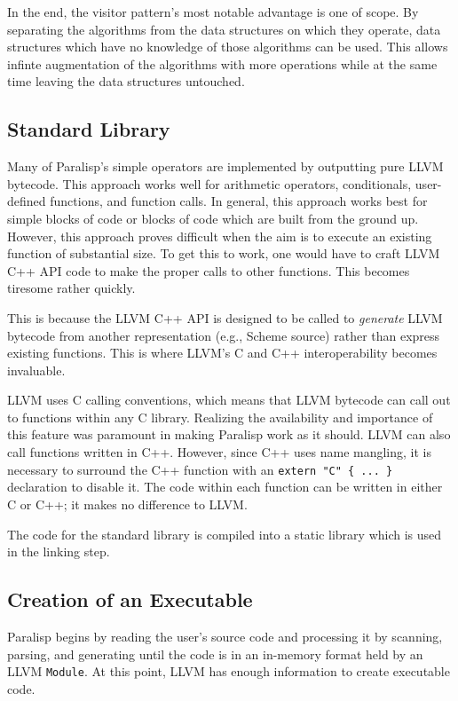 \documentclass[abstracton]{scrartcl}
\begin{document}
In the end, the visitor pattern's most notable advantage is one of scope. By separating the algorithms from the data structures on which they operate, data structures which have no knowledge of those algorithms can be used. This allows infinte augmentation of the algorithms with more operations while at the same time leaving the data structures untouched.

\subsection{Standard Library}

Many of Paralisp's simple operators are implemented by outputting pure LLVM bytecode. This approach works well for arithmetic operators, conditionals, user-defined functions, and function calls. In general, this approach works best for simple blocks of code or blocks of code which are built from the ground up. However, this approach proves difficult when the aim is to execute an existing function of substantial size. To get this to work, one would have to craft LLVM C++ API code to make the proper calls to other functions. This becomes tiresome rather quickly.

This is because the LLVM C++ API is designed to be called to \emph{generate} LLVM bytecode from another representation (e.g., Scheme source) rather than express existing functions. This is where LLVM's C and C++ interoperability becomes invaluable.

LLVM uses C calling conventions, which means that LLVM bytecode can call out to functions within any C library. Realizing the availability and importance of this feature was paramount in making Paralisp work as it should. LLVM can also call functions written in C++. However, since C++ uses name mangling, it is necessary to surround the C++ function with an \verb|extern "C" { ... }| declaration to disable it. The code within each function can be written in either C or C++; it makes no difference to LLVM.

The code for the standard library is compiled into a static library which is used in the linking step.

\subsection{Creation of an Executable}

Paralisp begins by reading the user's source code and processing it by scanning, parsing, and generating until the code is in an in-memory format held by an LLVM \verb|Module|. At this point, LLVM has enough information to create executable code.
\end{document}
